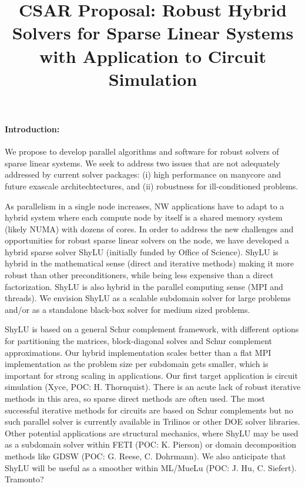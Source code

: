 \documentclass[10pt]{amsart}
\date{}
\title{CSAR Proposal: Robust Hybrid Solvers for Sparse Linear Systems with Application to Circuit Simulation}
\begin{document}
\maketitle

\paragraph{\bf Introduction:}
We propose to develop parallel algorithms and software for robust solvers
of sparse linear systems. We seek to address two issues that
are not adequately addressed by current solver packages:
(i) high performance on manycore and future exascale architechtectures, and
(ii) robustness for ill-conditioned problems.

As parallelism in a single node increases, NW applications
have to adapt to a hybrid system where each compute node by itself
is a shared memory system (likely NUMA) with dozens of cores. 
In order to address the new challenges and opportunities 
for robust sparse linear solvers on the node,
we have developed a hybrid sparse solver ShyLU (initially funded by 
Office of Science). ShyLU is hybrid in the
mathematical sense (direct and iterative methods) making it more
robust than other preconditioners, while being less expensive
than a direct factorization.  ShyLU is also hybrid in the parallel
computing sense (MPI and threads). We envision ShyLU as a scalable
subdomain solver for large problems and/or as a standalone black-box solver
for medium sized problems.

ShyLU is based on a general Schur complement framework, with different options
for partitioning the matrices, block-diagonal solves and Schur complement
approximations.  Our hybrid implementation scales better than
a flat MPI implementation as the problem size per subdomain gets smaller, 
which is important for strong scaling in applications.
Our first target application is circuit simulation (Xyce, POC: H. Thornquist). 
There is an acute lack of robust iterative methods in this area, so sparse
direct methods are often used. The most successful iterative methods
for circuits are based on Schur complements but no such parallel solver
is currently available in Trilinos or other DOE solver libraries.
%
Other potential applications are structural mechanics, where ShyLU
may be used as a subdomain solver within FETI (POC: K. Pierson) or
domain decomposition methods like GDSW (POC: G. Reese, C. Dohrmann). 
We also anticipate that ShyLU
will be useful as a smoother within ML/MueLu (POC: J. Hu, C. Siefert).
Tramonto?
\end{document}
